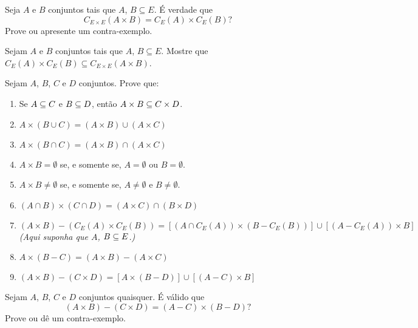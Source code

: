 \documentclass[12pt]{exam}
\begin{document}
    \questao{} Seja $A$ e $B$ conjuntos tais que $A$, $B \subseteq E$. É verdade que
    \[
        C_{E\times E}(A \times B) = C_E(A) \times C_E(B)?
    \]
    Prove ou apresente um contra-exemplo.

    \newpage

    \questao{} Sejam $A$ e $B$ conjuntos tais que $A$, $B \subseteq E$. Mostre que $C_E(A) \times C_E(B) \subseteq C_{E \times E}(A \times B)$.

    \vspace{.3cm}

    \questao{} Sejam $A$, $B$, $C$ e $D$ conjuntos. Prove que:
    \begin{enumerate}[label={\alph*})]
        \item Se $A \subseteq C$ e $B \subseteq D$, ent\~ao $A \times B \subseteq C \times D$.

        \item $A \times (B \cup C) = (A \times B) \cup (A \times C)$

        \item $A \times (B \cap C) = (A \times B) \cap (A \times C)$

        \item $A \times B = \emptyset$ se, e somente se, $A = \emptyset$ ou $B = \emptyset$.

        \item $A \times B \ne \emptyset$ se, e somente se, $A \ne \emptyset$ e $B \ne \emptyset$.

        \item $(A \cap B) \times (C \cap D) = (A \times C) \cap (B \times D)$

        \item $(A \times B) - (C_E(A) \times C_E(B)) = [(A \cap C_E(A)) \times (B - C_E(B))] \cup [(A - C_E(A)) \times B]$  \textit{(Aqui suponha que $A$, $B \subseteq E$.)}

        \item $A \times (B - C) = (A \times B) - (A \times C)$

        \item $(A \times B) - (C \times D) = [A \times (B - D)] \cup [(A - C) \times B]$
    \end{enumerate}

    \vspace{.3cm}

    \questao{} Sejam $A$, $B$, $C$ e $D$ conjuntos quaisquer. É válido que
    \[
        (A \times B) - (C \times D) = (A - C) \times (B - D)?
    \]
    Prove ou dê um contra-exemplo.
\end{document}
